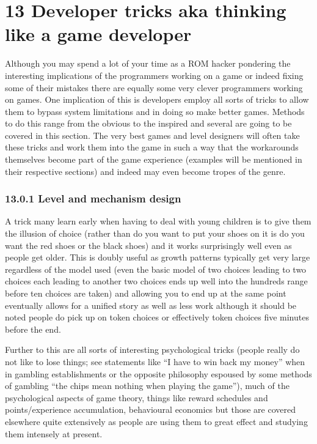 \documentclass[
]{book}
\begin{document}
\hypertarget{developer-tricks-aka-thinking-like-a-game-developer}{%
\chapter{13 Developer tricks aka thinking like a game developer}\label{developer-tricks-aka-thinking-like-a-game-developer}}

Although you may spend a lot of your time as a ROM hacker pondering the interesting implications of the programmers working on a game or indeed fixing some of their mistakes there are equally some very clever programmers working on games. One implication of this is developers employ all sorts of tricks to allow them to bypass system limitations and in doing so make better games. Methods to do this range from the obvious to the inspired and several are going to be covered in this section. The very best games and level designers will often take these tricks and work them into the game in such a way that the workarounds themselves become part of the game experience (examples will be mentioned in their respective sections) and indeed may even become tropes of the genre.

\hypertarget{level-and-mechanism-design}{%
\subsection{13.0.1 Level and mechanism design}\label{level-and-mechanism-design}}

A trick many learn early when having to deal with young children is to give them the illusion of choice (rather than do you want to put your shoes on it is do you want the red shoes or the black shoes) and it works surprisingly well even as people get older. This is doubly useful as growth patterns typically get very large regardless of the model used (even the basic model of two choices leading to two choices each leading to another two choices ends up well into the hundreds range before ten choices are taken) and allowing you to end up at the same point eventually allows for a unified story as well as less work although it should be noted people do pick up on token choices or effectively token choices five minutes before the end.

Further to this are all sorts of interesting psychological tricks (people really do not like to lose things; see statements like ``I have to win back my money'' when in gambling establishments or the opposite philosophy espoused by some methods of gambling ``the chips mean nothing when playing the game''), much of the psychological aspects of game theory, things like reward schedules and points/experience accumulation, behavioural economics but those are covered elsewhere quite extensively as people are using them to great effect and studying them intensely at present.
\end{document}
